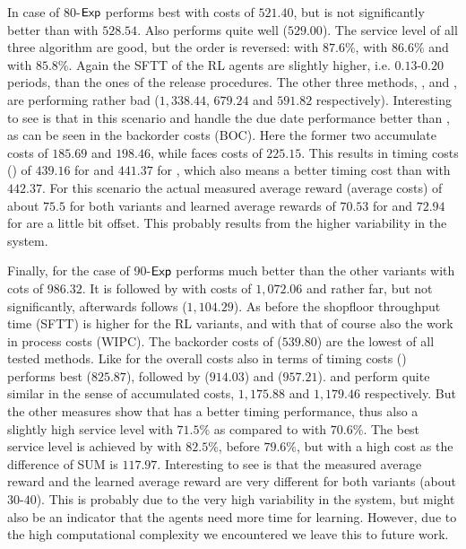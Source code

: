 \documentclass[envcountsame]{llncs}
\begin{document}
In case of 80-\(\mathsf{Exp}\) \BILThree{} performs best with costs of \(521.40\), but is not significantly
better than  with \(528.54\). Also  performs quite well (\(529.00\)). The
service level of all three algorithm are good, but the order is reversed:  with
\(87.6\%\),  with \(86.6\%\) and \BILThree{} with \(85.8\%\). Again the SFTT of the RL
agents are slightly higher, i.e. \(0.13\)-\(0.20\) periods, than the ones of the \BIL{} release
procedures. The other three \BIL{} methods, \BILOne{}, \BILTwo{} and \BILFour{}, are performing
rather bad (\(1,338.44\), \(679.24\) and \(591.82\) respectively). Interesting to see is that in
this scenario  and  handle the due date performance better than , as
can be seen in the backorder costs (BOC). Here the former two accumulate costs of \(185.69\) and
\(198.46\), while  faces costs of \(225.15\). This results in timing costs (\fgibocName{})
of \(439.16\) for  and \(441.37\) for , which also means a better timing cost
than \BILThree{} with \(442.37\). For this scenario the actual measured average reward (average
costs) of about \(75.5\) for both \ARA{} variants and learned average rewards of \(70.53\) for
 and \(72.94\) for  are a little bit offset. This probably results from the
higher variability in the system.

Finally, for the case of 90-\(\mathsf{Exp}\)  performs much better than the other variants with
cots of \(986.32\). It is followed by  with costs of \(1,072.06\) and rather far, but not
significantly, afterwards follows \BILFour{} (\(1,104.29\)). As before the shopfloor throughput time
(SFTT) is higher for the RL variants, and with that of course also the work in process costs (WIPC).
The backorder costs of  (\(539.80\)) are the lowest of all tested methods. Like for the
overall costs also in terms of timing costs (\fgibocName{})  performs best (\(825.87\)),
followed by  (\(914.03\)) and \BILFour{} (\(957.21\)).
%
\BILThree{} and  perform quite similar in the sense of accumulated costs, \(1,175.88\) and
\(1,179.46\) respectively. But the other measures show that  has a better timing
performance, thus also a slightly high service level with \(71.5\%\) as compared to \BILThree{} with
\(70.6\%\). The best service level is achieved by \BILFour{} with \(82.5\%\), before 
\(79.6\%\), but with a high cost as the difference of SUM is \(117.97\).
%
Interesting to see is that the measured average reward and the learned average reward are very
different for both \ARA{} variants (about \(30\)-\(40\)). This is probably due to the very high
variability in the system, but might also be an indicator that the agents need more time for
learning. However, due to the high computational complexity we encountered we leave this to future
work.
\end{document}
